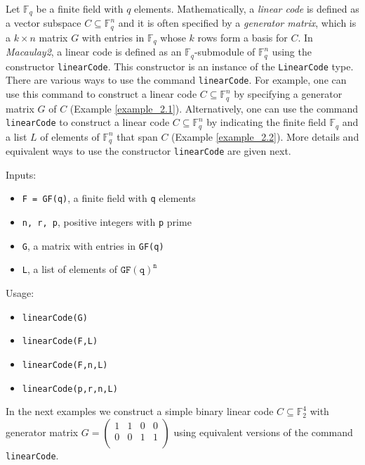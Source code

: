 \documentclass[12pt]{amsart}
\theoremstyle{plain}
\begin{document}
Let $\mathbb{F}_q$ be a finite field with $q$ elements. Mathematically, a {\it linear code} is defined as a vector subspace $C\subseteq \mathbb{F}_q^n$ and it is often specified by a {\it generator matrix}, which is a $k \times n$ matrix $G$ with entries in $\mathbb{F}_q$ whose $k$ rows form a basis for $C$. In {\it Macaulay2}, a linear code is defined as an $\mathbb{F}_q$-submodule of $\mathbb{F}_q^n$ using the constructor {\tt linearCode}.  This constructor is an instance of the {\tt LinearCode} type. There are various ways to use the command {\tt linearCode}. For example, one can use this command to construct a linear code $C\subseteq \mathbb{F}^n_q$ by specifying a generator matrix $G$ of $C$ (Example \ref{example_2.1}). Alternatively, one can use the command {\tt linearCode} to construct a linear code $C\subseteq \mathbb{F}_q^n$ by indicating the finite field $\mathbb{F}_q$ and a list $L$ of elements of $\mathbb{F}_q^n$ that span $C$ (Example \ref{example_2.2}).  More details and equivalent ways to use the constructor {\tt linearCode} are given next.

\medskip

\begin{minipage}[t]{0.6\textwidth}
 Inputs:
 \begin{itemize}[leftmargin=0.55 cm]
  \item {\tt F = GF(q)}, a finite field with {\tt q} elements
  \item {\tt n, r, p}, positive integers with {\tt p} prime
  \item {\tt G}, a matrix with entries in {\tt GF(q)}
  \item {\tt L}, a list of elements of $\mathtt{GF(q)}^\mathtt{n}$
 \end{itemize}
\end{minipage}
\begin{minipage}[t]{0.35\textwidth}
Usage:
\begin{itemize}[leftmargin=0.55 cm]
\item {\tt linearCode(G)}
\item {\tt linearCode(F,L)}
\item {\tt linearCode(F,n,L)}
\item {\tt linearCode(p,r,n,L)}
\end{itemize}
\end{minipage}

\medskip

In the next examples we construct a simple binary linear code $C\subseteq \mathbb{F}^4_2$ with generator matrix 
$G=
\begin{pmatrix}
 1 & 1 & 0 & 0\\
 0 & 0 & 1 & 1\\
\end{pmatrix}
$ using equivalent versions of the command {\tt linearCode}.
\end{document}
